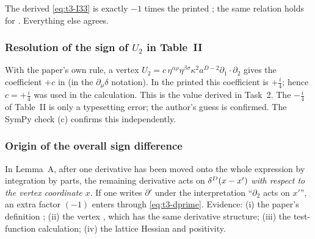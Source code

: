 \begin{discbox}
The derived \eqref{eq:t3-I33} is exactly \(-1\) times the printed ; the same
relation holds for . Everything else agrees.
\end{discbox}

\subsubsection{Resolution of the sign of \texorpdfstring{$U_2$}{U2} in Table~II}
With the paper's own rule, a vertex \(U_2=c\,\eta^{\alpha\rho}\eta^{\beta\sigma}\kappa^2a^{D-2}\partial_1\!\cdot\partial_2\)
gives the coefficient \(+c\) in  (in the \(\partial_\mu\delta\) notation). In the
printed  this coefficient is \(+\tfrac i4\); hence \(c=+\tfrac i4\) was used in the
calculation. This is the value derived in Task~2. The \(-\tfrac i4\) of Table~II is only
a typesetting error; the author's guess is confirmed. The SymPy check (c) confirms this
independently.

\subsubsection{Origin of the overall sign difference}
In Lemma~A, after one derivative has been moved onto the whole expression by integration
by parts, the remaining derivative acts on \(\delta^D(x-x')\) \emph{with respect to the vertex
coordinate \(x\)}. If one writes \(\partial'\) under the interpretation ``\(\partial_2\) acts on
\(x'\)'', an extra factor \((-1)\) enters through \eqref{eq:t3-dprime}. Evidence:
(i) the paper's definition ; (ii) the vertex , which has the same
derivative structure; (iii) the test-function calculation; (iv) the lattice Hessian and
positivity.

